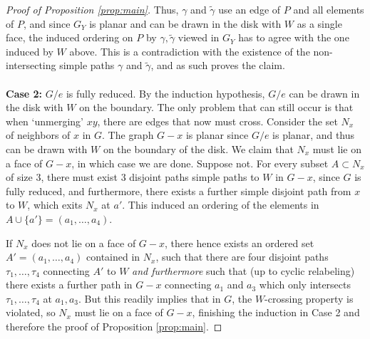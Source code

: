 \documentclass[10pt,a4paper]{amsart}
\begin{document}
\begin{proof}[Proof of Proposition \ref{prop:main}]
	Thus, $\gamma$ and $\widetilde{\gamma}$ use an edge of $P$ and all elements of $P$, 
	and since $G_Y$ is planar and can be drawn in the disk with $W$ as a single face, the induced ordering on $P$ by $\gamma, \widetilde{\gamma}$
	viewed in $G_Y$ has to agree with the one induced by $W$ above. 
	This is a contradiction with the existence of the non-intersecting simple paths $\gamma$ and $\widetilde{\gamma}$,
	and as such proves the claim. 
	\\
	\\
	\textbf{Case 2:} $G / e$ is fully reduced. 
	By the induction hypothesis, $G / e$ can be drawn in the disk with $W$ on the boundary. 
	The only problem that can still occur is that when `unmerging' $xy$, there are edges that now must cross. 
	Consider the set $N_x$ of neighbors of $x$ in $G$. 
	The graph $G - x$ is planar since $G / e$ is planar, and thus can be drawn with $W$ on the boundary of the disk. 
	We claim that $N_x$ must lie on a face of $G - x$, in which case we are done. 
	Suppose not. 
	For every subset $A \subset N_x$ of size $3$, there must exist $3$ disjoint paths simple paths to $W$ in $G - x$, 
	since $G$ is fully reduced, and furthermore, there exists a further simple disjoint path from $x$ to $W$, 
	which exits $N_x$ at $a'$. 
	This induced an ordering of the elements in $A \cup \{a'\} = (a_1, \ldots, a_4)$. 
	
	If $N_x$ does not lie on a face of $G - x$, there hence exists an ordered set $A' = (a_1, \ldots, a_4)$ contained in $N_x$, 
	such that there are four disjoint paths $\tau_1, \ldots, \tau_4$ connecting $A'$ to $W$ \emph{and furthermore} such that
	(up to cyclic relabeling) there exists a further path in $G - x$ connecting $a_1$ and $a_3$ which only intersects $\tau_1, \ldots, \tau_4$ 
	at $a_1, a_3$. 
	But this readily implies that in $G$, the $W$-crossing property is violated, so $N_x$ must lie on a face of $G - x$,
	finishing the induction in Case 2 and therefore the proof of Proposition \ref{prop:main}. 
\end{proof}
\end{document}
